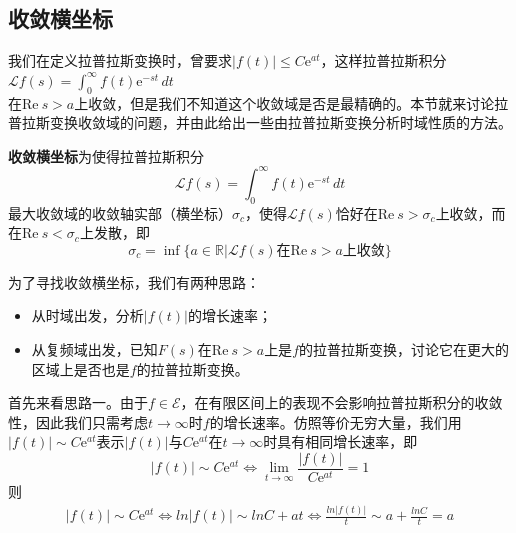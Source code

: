 \documentclass{ctexbook}
\begin{document}
\subsection{收敛横坐标}\label{sub:converge_abscissa}
我们在定义拉普拉斯变换时，曾要求$|f(t)|\leq C \mathrm{e}^{at}$，这样拉普拉斯积分$\mathcal{L} f(s)=\int_{0}^{\infty}f(t)\mathrm{e}^{-st}\,dt$\\
在$\text{Re}\ s>a$上收敛，但是我们不知道这个收敛域是否是最精确的。本节就来讨论拉普拉斯变换收敛域的问题，并由此给出一些由拉普拉斯变换分析时域性质的方法。

\begin{definition}[收敛横坐标]
    \textbf{收敛横坐标}为使得拉普拉斯积分$$\mathcal{L} f(s)=\int_{0}^{\infty}f(t)\mathrm{e}^{-st}\,dt$$最大收敛域的收敛轴实部（横坐标）$\sigma_c$，使得$\mathcal{L} f(s)$恰好在$\text{Re}\ s>\sigma_c$上收敛，而在$\text{Re}\ s<\sigma_c$上发散，即
    \[\sigma_c=\inf\{a\in\mathbb{R}|\mathcal{L} f(s)\text{在}\text{Re}\ s>a\text{上收敛}\}\]
\end{definition}

为了寻找收敛横坐标，我们有两种思路：
\begin{itemize}
    \item 从时域出发，分析$|f(t)|$的增长速率；
    \item 从复频域出发，已知$F(s)$在$\text{Re}\ s>a$上是$f$的拉普拉斯变换，讨论它在更大的区域上是否也是$f$的拉普拉斯变换。
\end{itemize}

首先来看思路一。由于$f\in\mathcal{E} $，在有限区间上的表现不会影响拉普拉斯积分的收敛性，因此我们只需考虑$t\to\infty$时$f$的增长速率。仿照等价无穷大量，我们用$|f(t)|\sim C \mathrm{e}^{a t}$表示$|f(t)|$与$C \mathrm{e}^{a t}$在$t\to\infty$时具有相同增长速率，即
\[|f(t)|\sim C \mathrm{e}^{a t}\iff \lim_{t\to\infty}\frac{|f(t)|}{C \mathrm{e}^{a t}}=1\]
则\begin{align*}
    |f(t)|\sim C \mathrm{e}^{a t}\iff ln|f(t)|\sim ln C +a t\iff\frac{ln|f(t)|}{t}\sim a +\frac{ln C}{t}=a
\end{align*}
\end{document}
